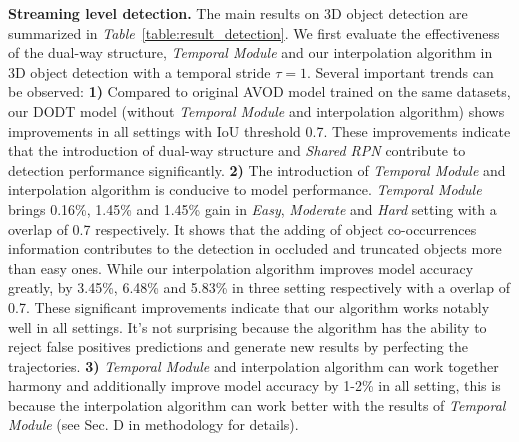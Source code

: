 \documentclass[a4paper, 10pt, conference]{ieeeconf}      %
\def\tablename{\emph{Table}}
\begin{document}
\textbf{Streaming level detection.} The main results on 3D object detection are summarized in \tablename \, \ref{table:result_detection}. We first evaluate the effectiveness of the dual-way structure, \textit{Temporal Module} and our interpolation algorithm  in 3D object detection with a temporal stride $\tau = 1$. Several important trends can be observed: \textbf{1)} Compared to original AVOD \cite{ku2018joint} model trained on the same datasets, our DODT model (without \textit{Temporal Module} and interpolation algorithm) shows improvements in all settings with IoU threshold 0.7. These improvements indicate that the introduction of dual-way structure and \textit{Shared RPN} contribute to detection performance significantly. \textbf{2)} The introduction of \textit{Temporal Module} and interpolation algorithm is conducive to model performance. \textit{Temporal Module} brings 0.16\%, 1.45\% and 1.45\% gain in \textit{Easy}, \textit{Moderate} and \textit{Hard} setting with a overlap of 0.7 respectively. It shows that the adding of object co-occurrences information contributes to the detection in occluded and truncated objects more than easy ones. While our interpolation algorithm improves model accuracy greatly, by 3.45\%, 6.48\% and 5.83\% in three setting respectively with a overlap of 0.7. These significant improvements indicate that our algorithm works notably well in all settings. It's not surprising because the algorithm has the ability to reject false positives predictions and generate new results by perfecting the trajectories. \textbf{3)} \textit{Temporal Module} and interpolation algorithm can work together harmony and additionally improve model accuracy by 1-2\% in all setting, this is because the interpolation algorithm can work better with the results of \textit{Temporal Module} (see Sec. D in methodology for details). 
\end{document}

